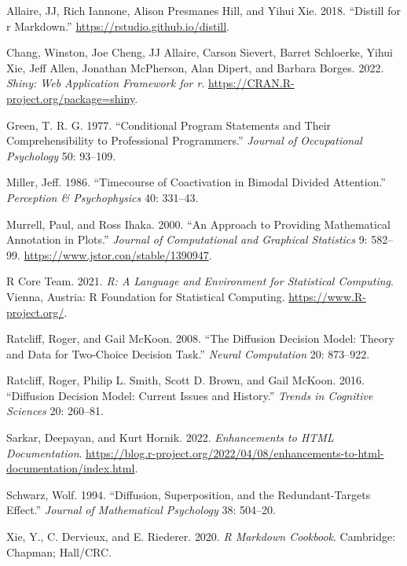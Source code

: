 \hypertarget{refs}{}
\begin{CSLReferences}{1}{0}
\leavevmode{}%
Allaire, JJ, Rich Iannone, Alison Presmanes Hill, and Yihui Xie. 2018. {``Distill for r Markdown.''} \url{https://rstudio.github.io/distill}.

\leavevmode{}%
Chang, Winston, Joe Cheng, JJ Allaire, Carson Sievert, Barret Schloerke, Yihui Xie, Jeff Allen, Jonathan McPherson, Alan Dipert, and Barbara Borges. 2022. \emph{Shiny: Web Application Framework for r}. \url{https://CRAN.R-project.org/package=shiny}.

\leavevmode{}%
Green, T. R. G. 1977. {``Conditional Program Statements and Their Comprehensibility to Professional Programmers.''} \emph{Journal of Occupational Psychology} 50: 93--109.

\leavevmode{}%
Miller, Jeff. 1986. {``Timecourse of Coactivation in Bimodal Divided Attention.''} \emph{Perception \& {P}sychophysics} 40: 331--43.

\leavevmode{}%
Murrell, Paul, and Ross Ihaka. 2000. {``An Approach to Providing Mathematical Annotation in Plots.''} \emph{Journal of Computational and Graphical Statistics} 9: 582--99. \url{https://www.jstor.con/stable/1390947}.

\leavevmode{}%
R Core Team. 2021. \emph{R: A Language and Environment for Statistical Computing}. Vienna, Austria: R Foundation for Statistical Computing. \url{https://www.R-project.org/}.

\leavevmode{}%
Ratcliff, Roger, and Gail McKoon. 2008. {``The Diffusion Decision Model: Theory and Data for Two-Choice Decision Task.''} \emph{Neural Computation} 20: 873--922.

\leavevmode{}%
Ratcliff, Roger, Philip L. Smith, Scott D. Brown, and Gail McKoon. 2016. {``Diffusion Decision Model: Current Issues and History.''} \emph{Trends in Cognitive Sciences} 20: 260--81.

\leavevmode{}%
Sarkar, Deepayan, and Kurt Hornik. 2022. \emph{Enhancements to {HTML} {D}ocumentation}. \url{https://blog.r-project.org/2022/04/08/enhancements-to-html-documentation/index.html}.

\leavevmode{}%
Schwarz, Wolf. 1994. {``Diffusion, Superposition, and the Redundant-Targets Effect.''} \emph{Journal of Mathematical Psychology} 38: 504--20.

\leavevmode{}%
Xie, Y., C. Dervieux, and E. Riederer. 2020. \emph{R Markdown Cookbook}. Cambridge: Chapman; Hall/CRC.

\end{CSLReferences}

